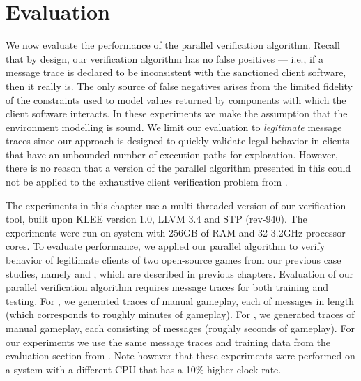 \section{Evaluation}
\label{sec:par:eval}

We now evaluate the performance of the parallel verification
algorithm. Recall that by design, our verification algorithm has no
false positives --- i.e., if a message trace is declared to be
inconsistent with the sanctioned client software, then it really is.
The only source of false negatives arises from the limited
fidelity of the constraints used to model values returned by
components with which the client software interacts. In these
experiments we make the assumption that the environment modelling is
sound.
We limit our evaluation to \textit{legitimate} message traces since 
our approach is designed to
quickly validate legal behavior in clients that have an unbounded
number of execution paths for exploration.
However, there is no reason that a version of the parallel algorithm 
presented in this \paper could not be applied to the exhaustive
client verification problem from .

The experiments in this chapter use a multi-threaded version of our
verification tool, built upon KLEE version 1.0\cite{cadar08:klee}, LLVM
3.4\cite{lattner04:llvm} and STP
(rev-940)\cite{ganesh07:stp}.  The experiments were run on system
with 256GB of RAM and 32 3.2GHz processor cores. To evaluate
performance, we applied our parallel algorithm to verify behavior of
legitimate clients of two open-source games from our previous case
studies, namely \xpilot and \tetrinet, which are described in previous
chapters. Evaluation of our parallel verification algorithm requires
message traces for both training and testing.  For \tetrinet, we
generated \tetrinetTraces traces of manual gameplay, each of
\tetrinetTraceLength messages in length (which corresponds to roughly
\tetrinetTraceMins minutes of gameplay).  For \xpilot, we generated
\xpilotTraces traces of manual gameplay, each consisting of
\xpilotTraceLength messages (roughly \xpilotTraceSecs seconds of
gameplay). For our experiments we use the same message traces and
training data from the evaluation section from
. Note however that these experiments were performed
on a system with a different CPU that has a 10\% higher clock rate.

